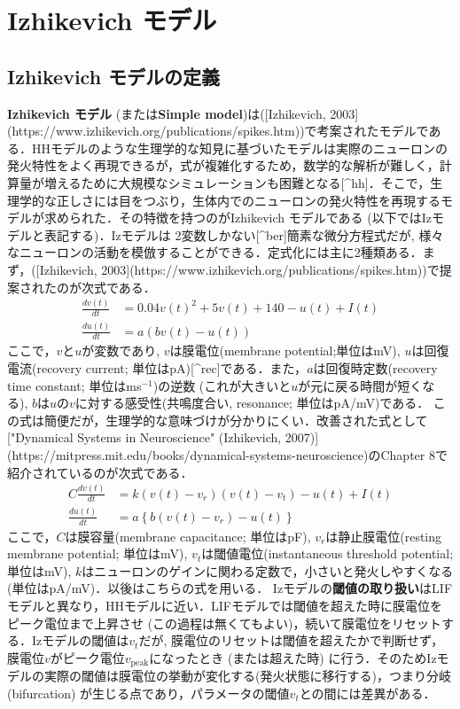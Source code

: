 \section{Izhikevich モデル}\subsection{Izhikevich モデルの定義}\textbf{Izhikevich モデル} (または\textbf{Simple model})は([Izhikevich, 2003](https://www.izhikevich.org/publications/spikes.htm))で考案されたモデルである．HHモデルのような生理学的な知見に基づいたモデルは実際のニューロンの発火特性をよく再現できるが，式が複雑化するため，数学的な解析が難しく，計算量が増えるために大規模なシミュレーションも困難となる[^hh]．そこで，生理学的な正しさには目をつぶり，生体内でのニューロンの発火特性を再現するモデルが求められた．その特徴を持つのがIzhikevich モデルである (以下ではIzモデルと表記する)．Izモデルは 2変数しかない[^ber]簡素な微分方程式だが, 様々なニューロンの活動を模倣することができる．定式化には主に2種類ある．まず，([Izhikevich, 2003](https://www.izhikevich.org/publications/spikes.htm))で提案されたのが次式である．
$$
\begin{align}
\frac{dv(t)}{dt}&=0.04v(t)^2 + 5v(t)+140-u(t)+I(t) \\
\frac{du(t)}{dt}&=a(bv(t)-u(t))
\end{align} 
$$
ここで，$v$と$u$が変数であり, $v$は膜電位(membrane potential;単位はmV), $u$は回復電流(recovery current; 単位はpA)[^rec]である．また，$a$は回復時定数(recovery time constant; 単位はms$^{-1}$)の逆数 (これが大きいと$u$が元に戻る時間が短くなる), $b$は$u$の$v$に対する感受性(共鳴度合い,  resonance; 単位はpA/mV)である．
この式は簡便だが，生理学的な意味づけが分かりにくい．改善された式として["Dynamical Systems in Neuroscience" (Izhikevich, 2007)](https://mitpress.mit.edu/books/dynamical-systems-neuroscience)のChapter 8で紹介されているのが次式である．
$$
\begin{align}
C\frac{dv(t)}{dt}&=k\left(v(t)-v_r\right)\left(v(t)-v_t\right)-u(t)+I(t) \\
\frac{du(t)}{dt}&=a\left\{b\left(v(t)-v_{r}\right)-u(t)\right\}
\end{align} 
$$
ここで，$C$は膜容量(membrane capacitance; 単位はpF), $v_r$は静止膜電位(resting membrane potential; 単位はmV), $v_t$は閾値電位(instantaneous threshold potential; 単位はmV), $k$はニューロンのゲインに関わる定数で，小さいと発火しやすくなる (単位はpA/mV)．以後はこちらの式を用いる．
Izモデルの\textbf{閾値の取り扱い}はLIFモデルと異なり，HHモデルに近い．LIFモデルでは閾値を超えた時に膜電位をピーク電位まで上昇させ (この過程は無くてもよい)，続いて膜電位をリセットする．Izモデルの閾値は$v_t$だが, 膜電位のリセットは閾値を超えたかで判断せず，膜電位$v$がピーク電位$v_{\text{peak}}$になったとき (または超えた時) に行う．そのためIzモデルの実際の閾値は膜電位の挙動が変化する(発火状態に移行する)，つまり分岐(bifurcation) が生じる点であり，パラメータの閾値$v_t$との間には差異がある．
